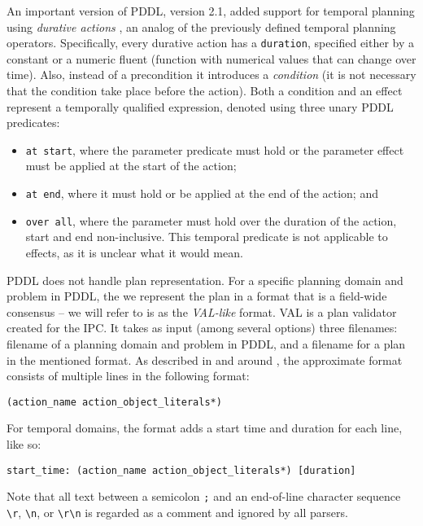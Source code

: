An important version of PDDL, version 2.1, added support for temporal
planning using \textit{durative actions} \citep[Section~5]{Fox2003},
an analog of the previously defined temporal planning operators.
Specifically, every durative action has a \texttt{duration}, specified
either by a constant or a numeric fluent (function with numerical values that
can change over time). Also, instead of a precondition it introduces a \textit{condition} (it is not necessary that the condition take place before the action).
Both a condition and an effect represent a temporally qualified expression,
denoted using three unary PDDL predicates:
\begin{itemize}
\item \texttt{at start}, where the parameter predicate must hold or the parameter effect must be applied at the start of the action;
\item \texttt{at end}, where it must hold or be applied at the end of the action; and
\item \texttt{over all}, where the parameter must hold over the duration of the action, start and end non-inclusive. This temporal predicate is not applicable to effects, as it is unclear what it would mean.
\end{itemize}

PDDL does not handle plan representation. For a specific planning domain and problem in PDDL,
the we represent the plan in a format that is a field-wide consensus -- we will refer to is
as the \textit{VAL-like} format. VAL \citep{Howey2003} is a plan validator created for the IPC.
It takes as input (among several options) three filenames: filename of a planning domain and
problem in PDDL, and a filename for a plan in the mentioned format.
As described in and around \citet[Figure~2]{Howey2003}, the approximate format
consists of multiple lines in the following format:
\begin{center}
\verb+(action_name action_object_literals*)+
\end{center}

For temporal domains, the format adds a start time and duration for each line, like so:
\begin{center}
\verb+start_time: (action_name action_object_literals*) [duration]+
\end{center}

Note that all text between a semicolon \verb+;+ and an end-of-line character sequence \verb+\r+, \verb+\n+, or \verb+\r\n+ is regarded as a comment and ignored by all parsers.

